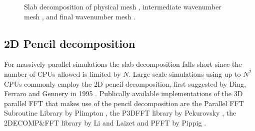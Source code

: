 \documentclass[final,1p,times]{elsarticle}
\begin{document}
\begin{figure}[t!]
{  \label{slabsubfig1}
}
\caption{Slab decomposition of physical mesh , intermediate wavenumber mesh , and final wavenumber mesh .  }
\label{fig:Slabdecomp}
\end{figure}

\subsection{2D Pencil decomposition}
\label{pencil2D}

For massively parallel simulations the slab decomposition falls short since the number of CPUs allowed is limited by $N$. Large-scale simulations using up to $N^2$ CPUs commonly employ the 2D pencil decomposition, first suggested by Ding, Ferraro and Gennery in 1995 \cite{Ding95}. Publically available implementations of the 3D parallel FFT that makes use of the pencil decomposition are the Parallel FFT Subroutine Library by Plimpton \cite{PlimptonFFT}, the P3DFFT library by Pekurovsky \cite{p3dfft, pekurovsky2012}, the 2DECOMP\&FFT library by Li and Laizet \cite{Li2010} and PFFT by Pippig \cite{Pi13}.
\end{document}
